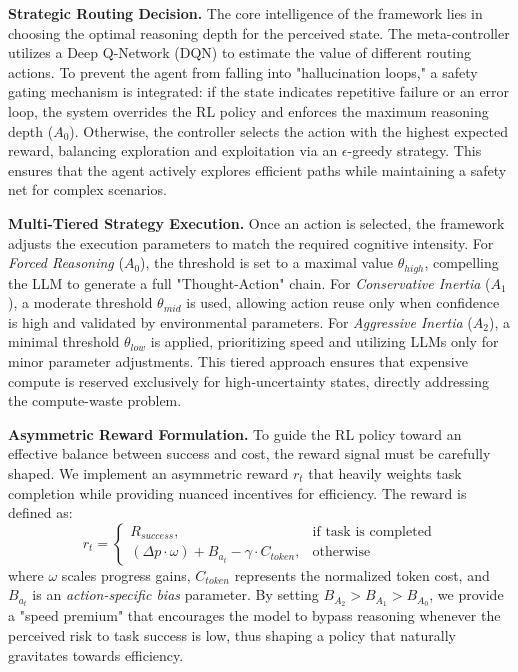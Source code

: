 \documentclass[runningheads]{llncs}
\begin{document}
\textbf{Strategic Routing Decision.} The core intelligence of the framework lies in choosing the optimal reasoning depth for the perceived state. The meta-controller utilizes a Deep Q-Network (DQN) to estimate the value of different routing actions. To prevent the agent from falling into "hallucination loops," a safety gating mechanism is integrated: if the state indicates repetitive failure or an error loop, the system overrides the RL policy and enforces the maximum reasoning depth ($A_0$). Otherwise, the controller selects the action with the highest expected reward, balancing exploration and exploitation via an $\epsilon$-greedy strategy. This ensures that the agent actively explores efficient paths while maintaining a safety net for complex scenarios.

\textbf{Multi-Tiered Strategy Execution.} Once an action is selected, the framework adjusts the execution parameters to match the required cognitive intensity. For \textit{Forced Reasoning} ($A_0$), the threshold is set to a maximal value $\theta_{high}$, compelling the LLM to generate a full "Thought-Action" chain. For \textit{Conservative Inertia} ($A_1$), a moderate threshold $\theta_{mid}$ is used, allowing action reuse only when confidence is high and validated by environmental parameters. For \textit{Aggressive Inertia} ($A_2$), a minimal threshold $\theta_{low}$ is applied, prioritizing speed and utilizing LLMs only for minor parameter adjustments. This tiered approach ensures that expensive compute is reserved exclusively for high-uncertainty states, directly addressing the compute-waste problem.

\textbf{Asymmetric Reward Formulation.} To guide the RL policy toward an effective balance between success and cost, the reward signal must be carefully shaped. We implement an asymmetric reward $r_t$ that heavily weights task completion while providing nuanced incentives for efficiency. The reward is defined as:
\begin{equation}
r_t = 
\begin{cases} 
R_{success}, & \text{if task is completed} \\
(\Delta p \cdot \omega) + B_{a_t} - \gamma \cdot C_{token}, & \text{otherwise}
\end{cases}
\end{equation}
where $\omega$ scales progress gains, $C_{token}$ represents the normalized token cost, and $B_{a_t}$ is an \textit{action-specific bias} parameter. By setting $B_{A_2} > B_{A_1} > B_{A_0}$, we provide a "speed premium" that encourages the model to bypass reasoning whenever the perceived risk to task success is low, thus shaping a policy that naturally gravitates towards efficiency.
\end{document}
